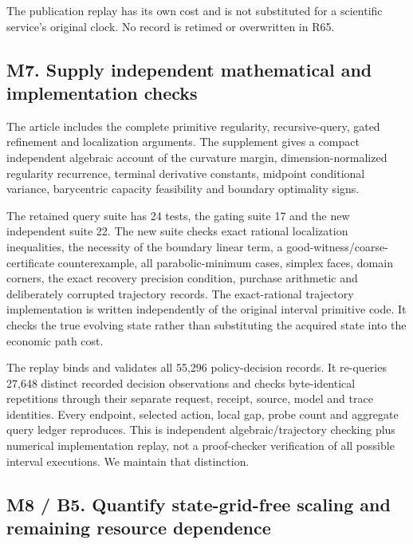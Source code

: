 \documentclass[ecta,nameyear,draft]{econsocart}
\begin{document}
The publication replay has its own cost and is not substituted for a
scientific service's original clock. No record is retimed or overwritten
in R65.

\hypertarget{m7.-supply-independent-mathematical-and-implementation-checks}{%
\subsection{M7. Supply independent mathematical and implementation
checks}\label{m7.-supply-independent-mathematical-and-implementation-checks}}

The article includes the complete primitive regularity, recursive-query,
gated refinement and localization arguments. The supplement gives a
compact independent algebraic account of the curvature margin,
dimension-normalized regularity recurrence, terminal derivative
constants, midpoint conditional variance, barycentric capacity
feasibility and boundary optimality signs.

The retained query suite has 24 tests, the gating suite 17 and the new
independent suite 22. The new suite checks exact rational localization
inequalities, the necessity of the boundary linear term, a
good-witness/coarse-certificate counterexample, all parabolic-minimum
cases, simplex faces, domain corners, the exact recovery precision
condition, purchase arithmetic and deliberately corrupted trajectory
records. The exact-rational trajectory implementation is written
independently of the original interval primitive code. It checks the
true evolving state rather than substituting the acquired state into the
economic path cost.

The replay binds and validates all 55,296 policy-decision records. It
re-queries 27,648 distinct recorded decision observations and checks
byte-identical repetitions through their separate request, receipt,
source, model and trace identities. Every endpoint, selected action,
local gap, probe count and aggregate query ledger reproduces. This is
independent algebraic/trajectory checking plus numerical implementation
replay, not a proof-checker verification of all possible interval
executions. We maintain that distinction.

\hypertarget{m8-b5.-quantify-state-grid-free-scaling-and-remaining-resource-dependence}{%
\subsection{M8 / B5. Quantify state-grid-free scaling and remaining
resource
dependence}\label{m8-b5.-quantify-state-grid-free-scaling-and-remaining-resource-dependence}}
\end{document}
